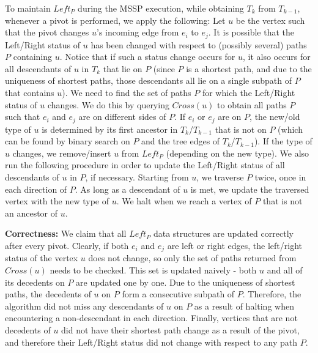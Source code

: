 \documentclass{article}
\begin{document}
To maintain $Left_P$ during the MSSP execution, while obtaining $T_{k}$ from $T_{k-1}$, whenever a pivot is performed, we apply the following:
    Let $u$ be the vertex such that the pivot changes $u$'s incoming edge from $e_i$ to $e_j$.
    It is possible that the Left/Right status of $u$ has been changed with respect to (possibly several) paths $P$ containing $u$.
    Notice that if such a status change occurs for $u$, it also occurs for all descendants of $u$ in $T_{k}$ that lie on $P$ (since $P$ is a shortest path, and due to the uniqueness of shortest paths, those descendants all lie on a single subpath of $P$ that contains $u$).
   We need to find the set of paths $P$ for which the Left/Right status of $u$ changes.
    We do this by querying $Cross(u)$ to obtain all paths $P$ such that $e_i$ and $e_j$ are on different sides of $P$.
    If $e_i$ or $e_j$ are on $P$, the new/old type of $u$ is determined by its first ancestor in $T_{k}$/$T_{k-1}$ that is not on $P$ (which can be found by binary search on $P$ and the tree edges of $T_{k}$/$T_{k-1}$).
    If the type of $u$ changes, we remove/insert $u$ from $Left_P$ (depending on the new type).
   We also run the following procedure in order to update the Left/Right status of all descendants of $u$ in $P$, if necessary.
    Starting from $u$, we traverse $P$ twice, once in each direction of $P$.
    As long as a descendant of $u$ is met, we update the traversed vertex with the new type of $u$.
    We halt when we reach a vertex of $P$ that is not an ancestor of $u$.


    \medskip
\noindent
{\bf Correctness:}
    We claim that all $Left_P$ data structures are updated correctly after every pivot.
    Clearly, if both $e_i$ and $e_j$ are left or right edges, the left/right status of the vertex $u$ does not change, so only the set of paths returned from $Cross(u)$ needs to be checked.
    This set is updated naively - both $u$ and all of its decedents on $P$ are updated one by one.
    Due to the uniqueness of shortest paths, the decedents of $u$ on $P$ form a consecutive subpath of $P$.
    Therefore, the algorithm did not miss any descendants of $u$ on $P$ as a result of halting when encountering a non-descendant in each direction.
    Finally, vertices that are not decedents of $u$ did not have their shortest path change as a result of the pivot, and therefore their Left/Right status did not change with respect to any path $P$.
\end{document}
